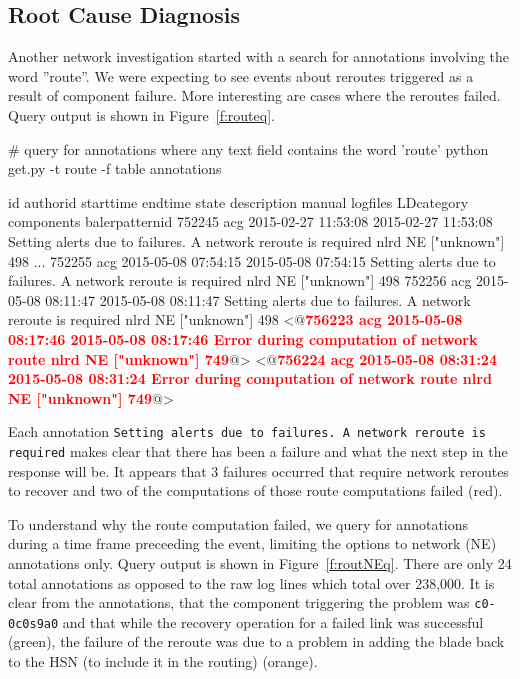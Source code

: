\subsection{Root Cause Diagnosis}
\label{s:route}
Another network investigation started with a search for annotations involving the word ''route''.
We were expecting to see events about reroutes triggered as a result of component failure. More interesting
are cases where the reroutes failed. Query output is shown in Figure~\ref{f:routeq}.

\begin{figure*}
\begin{annol}
# query for annotations where any text field contains the word 'route'
python get.py -t route -f table annotations

id	authorid	starttime	endtime	state	description	manual	logfiles LDcategory	components	balerpatternid
752245	acg	2015-02-27 11:53:08	2015-02-27 11:53:08	Setting alerts due to failures. A network reroute is required	nlrd	NE	["unknown"]	498
...
752255	acg	2015-05-08 07:54:15	2015-05-08 07:54:15	Setting alerts due to failures. A network reroute is required	nlrd	NE	["unknown"]	498
752256	acg	2015-05-08 08:11:47	2015-05-08 08:11:47	Setting alerts due to failures. A network reroute is required	nlrd	NE	["unknown"]	498
<@\textbf{\textcolor{red}{756223	acg	2015-05-08 08:17:46	2015-05-08 08:17:46	Error during computation of network route    nlrd	NE	["unknown"]	749}}@>
<@\textbf{\textcolor{red}{756224	acg	2015-05-08 08:31:24	2015-05-08 08:31:24	Error during computation of network route    nlrd	NE	["unknown"]	749}}@>
\end{annol}
\caption{Output of query for route annotations. Complete output = 15 annotations. Occurrences of network reroutes and failures in the rerouting process are of interest.}
\label{f:routeq}
\end{figure*}

Each annotation \texttt{Setting alerts due to failures. A network reroute is required} makes clear that there has been a failure and what the next step in the response will be. It appears that 3 failures occurred that require network reroutes to recover and two of the computations of those route computations failed (red).

To understand why the route computation failed, we query for annotations during a time frame preceeding the event, limiting the options to network (NE) annotations only.
Query output is shown in Figure~\ref{f:routNEq}. There are only 24 total annotations as opposed to the raw log lines which total over 238,000.
It is clear from the annotations, that the component triggering the problem was \texttt{c0-0c0s9a0} and that
while the recovery operation for a failed link was successful (green), the
failure of the reroute was due to  a problem in adding the blade back to the HSN (to include it in the routing) (orange).


